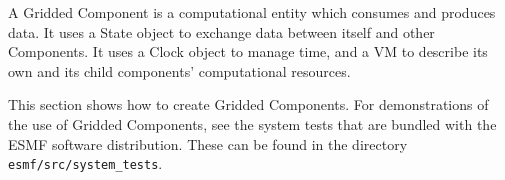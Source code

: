 %


A Gridded Component is a computational entity which consumes and produces data. It uses a State object to exchange data between itself and other Components. It uses a Clock object to manage time, and a VM to describe its own and its child components' computational resources.

This section shows how to create Gridded Components.  For demonstrations
of the use of Gridded Components, see the system tests that are bundled with the ESMF software
distribution.  These can be found in the directory {\tt esmf/src/system\_tests}.



